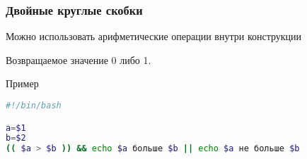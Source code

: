 \begin{frame}[fragile]
	\frametitle{Двойные круглые скобки}

	Можно использовать арифметические операции внутри конструкции\\

	Возвращаемое значение 0 либо 1.

	\begin{block}{Пример}
		\begin{lstlisting}[language=bash]
#!/bin/bash

a=$1
b=$2
(( $a > $b )) && echo $a больше $b || echo $a не больше $b
		\end{lstlisting}
	\end{block}
\end{frame}


